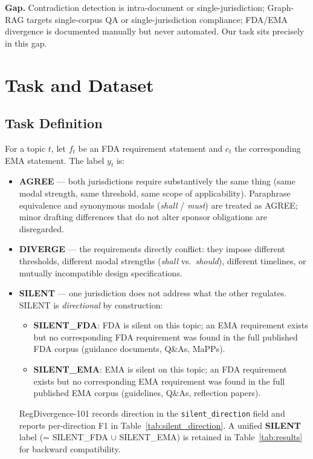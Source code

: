 \documentclass[manuscript]{acmart}
\begin{document}
\textbf{Gap.} Contradiction detection is intra-document or
single-jurisdiction; Graph-RAG targets single-corpus QA or
single-jurisdiction compliance; FDA/EMA divergence is documented manually but
never automated. Our task sits precisely in this gap.

\section{Task and Dataset}

\subsection{Task Definition}
\label{sec:taskdef}

For a topic $t$, let $f_t$ be an FDA requirement statement and $e_t$ the
corresponding EMA statement. The label $y_t$ is:
\begin{itemize}
\item \textbf{AGREE} --- both jurisdictions require substantively the same
  thing (same modal strength, same threshold, same scope of applicability).
  Paraphrase equivalence and synonymous modals (\textit{shall} / \textit{must})
  are treated as AGREE; minor drafting differences that do not alter sponsor
  obligations are disregarded.
\item \textbf{DIVERGE} --- the requirements directly conflict: they impose
  different thresholds, different modal strengths (\textit{shall} vs.\
  \textit{should}), different timelines, or mutually incompatible design
  specifications.
\item \textbf{SILENT} --- one jurisdiction does not address what the other
  regulates. SILENT is \textit{directional} by construction:
  \begin{itemize}
    \item \textbf{SILENT\_FDA}: FDA is silent on this topic; an EMA requirement
      exists but no corresponding FDA requirement was found in the full published
      FDA corpus (guidance documents, Q\&As, MaPPs).
    \item \textbf{SILENT\_EMA}: EMA is silent on this topic; an FDA requirement
      exists but no corresponding EMA requirement was found in the full published
      EMA corpus (guidelines, Q\&As, reflection papers).
  \end{itemize}
  RegDivergence-101 records direction in the \texttt{silent\_direction} field
  and reports per-direction F1 in Table~\ref{tab:silent_direction}. A unified
  \textbf{SILENT} label (= SILENT\_FDA $\cup$ SILENT\_EMA) is retained in
  Table~\ref{tab:results} for backward compatibility.
\end{itemize}
\end{document}
